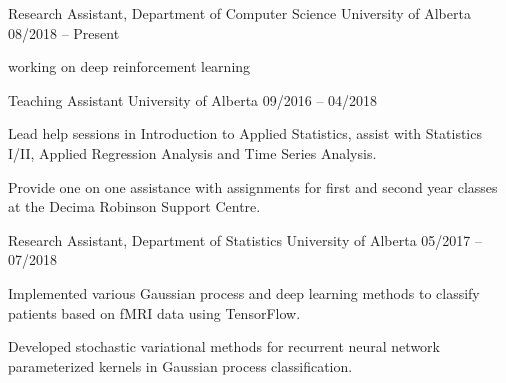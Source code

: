 \begin{cventries}
\cventry
    {Research Assistant, Department of Computer Science}
    {University of Alberta}
    {08/2018 -- Present}
    {
      \begin{cvitems}
      \item working on deep reinforcement learning
      \end{cvitems}
    }


  \cventry
    {Teaching Assistant}
    {University of Alberta}
    {09/2016 -- 04/2018}
    {
      \begin{cvitems}
        \item Lead help sessions in Introduction to Applied Statistics, assist with Statistics I/II, Applied Regression Analysis and Time Series Analysis.
        \item Provide one on one assistance with assignments for first and second year classes at the Decima Robinson Support Centre.
      \end{cvitems}
    }
\cventry
    {Research Assistant, Department of Statistics}
    {University of Alberta}
    {05/2017 -- 07/2018}
    {
      \begin{cvitems}
        \item Implemented various Gaussian process and deep learning methods to classify patients based on fMRI data using TensorFlow.
        \item Developed stochastic variational methods for recurrent neural network parameterized kernels in Gaussian process classification.
      \end{cvitems}
    }

\end{cventries}
